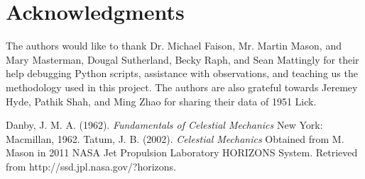 \documentclass[12pt,journal,compsoc]{IEEEtran}
\begin{document}
\section*{Acknowledgments}

The authors would like to thank Dr. Michael Faison, Mr. Martin Mason, and Mary Masterman, 
Dougal Sutherland, Becky Raph, and Sean Mattingly for their help debugging Python scripts, assistance with observations, and teaching us the methodology used in this project.
The authors are also grateful towards Jeremey Hyde, Pathik Shah, and Ming Zhao for sharing their
data of 1951 Lick.


\begin{thebibliography}{1}
Danby, J. M. A. (1962). \emph{Fundamentals of Celestial Mechanics} New York: Macmillan, 1962. 
Tatum, J. B. (2002). \emph{Celestial Mechanics} Obtained from M. Mason in 2011
{}
NASA Jet Propulsion Laboratory HORIZONS System. Retrieved from http://ssd.jpl.nasa.gov/?horizons.
\end{thebibliography}
\end{document}
